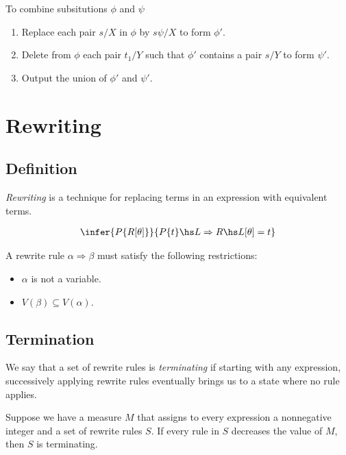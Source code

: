 \documentclass{article}
\begin{document}
To combine subsitutions $\phi$ and $\psi$
\begin{enumerate}
    \item Replace each pair $s/X$ in $\phi$ by $s\psi/X$ to form $\phi'$.
    \item Delete from $\phi$ each pair $t_1/Y$ such that $\phi'$ contains a pair $s/Y$ to form $\psi'$.
    \item Output the union of $\phi'$ and $\psi'$.
\end{enumerate}

\section{Rewriting}

\subsection{Definition}

\begin{definition}
    \emph{Rewriting} is a technique for replacing terms in an expression with equivalent terms.
\end{definition}

\begin{theorem}
    \begin{align*}
        \infer{P\{R[\theta]\}}{P\{t\}\hs L\Rightarrow R\hs L[\theta]=t}
    \end{align*} 
\end{theorem}

\begin{definition}
    A rewrite rule $\alpha\Rightarrow\beta$ must satisfy the following restrictions:
    \begin{itemize}
        \item $\alpha$ is not a variable.
        \item $V(\beta)\subseteq V(\alpha)$.
    \end{itemize}
\end{definition}

\subsection{Termination}

\begin{definition}
    We say that a set of rewrite rules is \emph{terminating} if starting with any expression,
    successively applying rewrite rules eventually brings us to a state where no rule applies. 
\end{definition}

\begin{theorem}
    Suppose we have a measure $M$ that assigns to every expression a nonnegative integer and
    a set of rewrite rules $S$. If every rule in $S$ decreases the value of $M$, then $S$ 
    is terminating.
\end{theorem}
\end{document}

